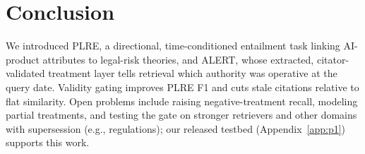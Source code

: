 \section{Conclusion}

We introduced PLRE, a directional, time-conditioned entailment task linking AI-product attributes to legal-risk theories, and ALERT, whose extracted, citator-validated treatment layer tells retrieval which authority was operative at the query date. Validity gating improves PLRE F1 and cuts stale citations relative to flat similarity. Open problems include raising negative-treatment recall, modeling partial treatments, and testing the gate on stronger retrievers and other domains with supersession (e.g., regulations); our released testbed (Appendix~\ref{app:p1}) supports this work.
